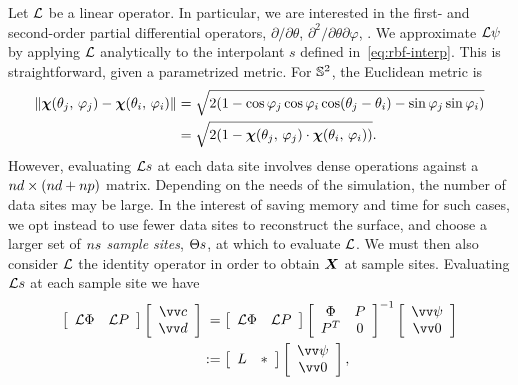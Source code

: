 Let $\mathcal{L}$ be a linear operator. In particular, we are interested in the first- and
second-order partial differential operators, $\partial/\partial\theta$,
$\partial^2/\partial\theta\partial\varphi$, . We approximate $\mathcal{L}\psi$ by
applying $\mathcal{L}$ analytically to the interpolant $s$ defined in~\eqref{eq:rbf-interp}. This
is straightforward, given a parametrized metric. For $\mathbb{S}^2$, the Euclidean metric is
\begin{equation}\label{eq:sphere-metric}
    \begin{aligned}
    \|\boldsymbol{\chi}(\theta_j,\,\varphi_j) - \boldsymbol{\chi}(\theta_i,\,\varphi_i)\|
    &= \sqrt{2(1 - \cos\varphi_j\cos\varphi_i\cos(\theta_j-\theta_i) - \sin\varphi_j\sin\varphi_i)} \\
    &= \sqrt{2(1-\boldsymbol{\chi}(\theta_j,\,\varphi_j)\cdot\boldsymbol{\chi}(\theta_i,\,\varphi_i))}.
\end{aligned}
\end{equation}
However, evaluating $\mathcal{L} s$ at each data site involves dense operations against a
$\data\cardinality\times(\data\cardinality+\poly\cardinality)$ matrix. Depending on the
needs of the simulation, the number of data sites may be large.  In the interest of
saving memory and time for such cases, we opt instead to use fewer data sites to
reconstruct the surface, and choose a larger set of $\sample\cardinality$ \emph{sample
sites}, $\sample\sites$, at which to evaluate $\mathcal{L}$. We must then also consider $\mathcal{L}$ the
identity operator in order to obtain $\boldsymbol{X}$ at sample sites. Evaluating $\mathcal{L} s$ at each
sample site we have
\begin{equation}\label{eq:rbf-operator}
    \begin{aligned}
    \left[\begin{array}{cc}
            \L\Phi & \L P
    \end{array}\right]\left[\begin{array}{c}
            \arr{c} \\ \arr{d}
    \end{array}\right] &\hphantom{:}=
    \left[\begin{array}{cc}
            \L\Phi & \L P
    \end{array}\right]\left[\begin{array}{cc}
            \Phi & P \\ P^T & 0
    \end{array}\right]^{-1}\left[\begin{array}{c}
            \arr{\psi} \\ \arr{0}
    \end{array}\right] \\ &:=
    \left[\begin{array}{cc}
            L & \ast
    \end{array}\right]\left[\begin{array}{c}
            \arr{\psi} \\ \arr{0}
    \end{array}\right],
\end{aligned}
\end{equation}
